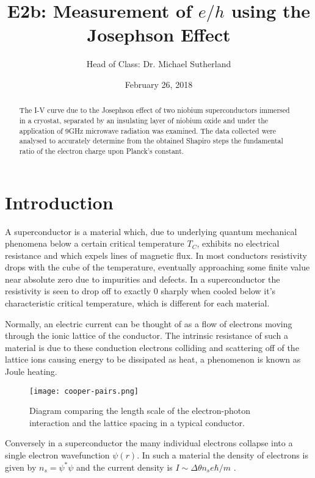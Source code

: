 \documentclass[11pt]{article}
\title{E2b: Measurement of $e / h$ using the Josephson Effect}
\author{Head of Class: Dr. Michael Sutherland}
\date{February 26, 2018}
\begin{document}
\maketitle

\begin{abstract}
The I-V curve due to the Josephson effect of two niobium superconductors immersed in a cryostat, separated by an insulating layer of niobium oxide and under the application of 9GHz microwave radiation was examined. The data collected were analysed to accurately determine from the obtained Shapiro steps the fundamental ratio of the electron charge upon Planck's constant.
\end{abstract}

\tableofcontents

\newpage
\section{Introduction}
A superconductor is a material which, due to underlying quantum mechanical phenomena below a certain critical temperature $T_C$, exhibits no electrical resistance and which expels lines of magnetic flux. In most conductors resistivity drops with the cube of the temperature, eventually approaching some finite value near absolute zero due to impurities and defects. In a superconductor the resistivity is seen to drop off to exactly 0 sharply when cooled below it's characteristic critical temperature, which is different for each material.

Normally, an electric current can be thought of as a flow of electrons moving through the ionic lattice of the conductor. The intrinsic resistance of such a material is due to these conduction electrons colliding and scattering off of the lattice ions causing energy to be dissipated as heat, a phenomenon is known as Joule heating.

\begin{wrapfigure}{r}{0.4\textwidth}
	\texttt{[image: cooper-pairs.png]}
	\caption{Diagram comparing the length scale of the electron-photon interaction and the lattice spacing in a typical conductor.}
	\label{cooperPairs}
\end{wrapfigure}

Conversely in a superconductor the many individual electrons collapse into a single electron wavefunction $\psi(r)$. In such a material the density of electrons is given by $n_s = \psi^*\psi$ and the current density is $I \sim \Delta\theta n_s e\hbar / m$ \cite{labmanual}.
\end{document}
